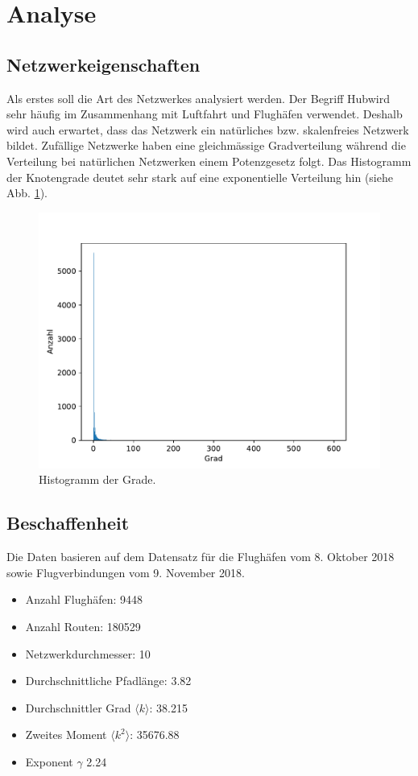 \section{Analyse}
\label{sec:Analysis}


\subsection{Netzwerkeigenschaften}
\label{sec:overview-numbers}
Als erstes soll die Art des Netzwerkes analysiert werden. Der Begriff \guillemotleft Hub\guillemotright wird sehr
häufig im Zusammenhang mit Luftfahrt und Flughäfen verwendet.
Deshalb wird auch erwartet, dass das Netzwerk ein natürliches bzw. skalenfreies Netzwerk bildet.
Zufällige Netzwerke haben eine gleichmässige Gradverteilung während die Verteilung bei natürlichen Netzwerken einem
Potenzgesetz folgt.
Das Histogramm der Knotengrade deutet sehr stark auf eine exponentielle Verteilung hin (siehe Abb. \ref{fig:degreeHistogram}).

\begin{figure}
    \centering
    \includegraphics[width=0.75\linewidth]{images/degree-histogram.pdf}
    \caption{Histogramm der Grade.}
    \label{fig:degreeHistogram}
\end{figure}

\subsection{Beschaffenheit}

Die Daten basieren auf dem Datensatz für die Flughäfen vom 8. Oktober 2018 sowie Flugverbindungen vom 9. November 2018.
\vspace{2em}

\begin{itemize}
    \item Anzahl Flughäfen: 9448
    \item Anzahl Routen: 180529
    \item Netzwerkdurchmesser: 10
    \item Durchschnittliche Pfadlänge: 3.82
    \item Durchschnittler Grad $\langle k\rangle$: 38.215
    \item Zweites Moment $\langle k^{2}\rangle$: 35676.88
    \item Exponent $\gamma$ 2.24
\end{itemize}

